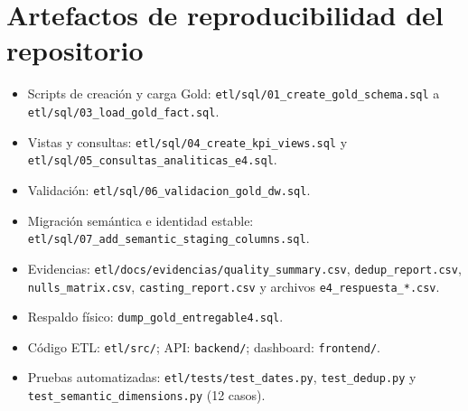 \documentclass[12pt,a4paper]{article}
\newcommand{\pathcode}[1]{\begingroup\small\ttfamily\nolinkurl{#1}\endgroup}
\begin{document}
\section{Artefactos de reproducibilidad del repositorio}

\begin{itemize}[leftmargin=1.0cm]
  \item Scripts de creación y carga Gold: \pathcode{etl/sql/01_create_gold_schema.sql} a \pathcode{etl/sql/03_load_gold_fact.sql}.
  \item Vistas y consultas: \pathcode{etl/sql/04_create_kpi_views.sql} y \pathcode{etl/sql/05_consultas_analiticas_e4.sql}.
  \item Validación: \pathcode{etl/sql/06_validacion_gold_dw.sql}.
  \item Migración semántica e identidad estable: \pathcode{etl/sql/07_add_semantic_staging_columns.sql}.
  \item Evidencias: \pathcode{etl/docs/evidencias/quality_summary.csv}, \pathcode{dedup_report.csv}, \pathcode{nulls_matrix.csv}, \pathcode{casting_report.csv} y archivos \pathcode{e4_respuesta_*.csv}.
  \item Respaldo físico: \pathcode{dump_gold_entregable4.sql}.
  \item Código ETL: \pathcode{etl/src/}; API: \pathcode{backend/}; dashboard: \pathcode{frontend/}.
  \item Pruebas automatizadas: \pathcode{etl/tests/test_dates.py}, \pathcode{test_dedup.py} y \pathcode{test_semantic_dimensions.py} (12 casos).
\end{itemize}
\end{document}
